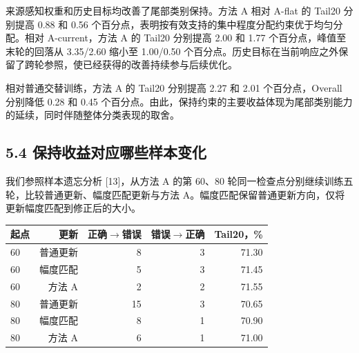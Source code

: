 \documentclass[10pt,twocolumn,letterpaper]{article}
\begin{document}
来源感知权重和历史目标均改善了尾部类别保持。方法 A 相对 A-flat 的 Tail20 分别提高 0.88 和 0.56 个百分点，表明按有效支持的集中程度分配约束优于均匀分配。相对 A-current，方法 A 的 Tail20 分别提高 2.00 和 1.77 个百分点，峰值至末轮的回落从 3.35/2.60 缩小至 1.00/0.50 个百分点。历史目标在当前响应之外保留了跨轮参照，使已经获得的改善持续参与后续优化。


相对普通交替训练，方法 A 的 Tail20 分别提高 2.27 和 2.01 个百分点，Overall 分别降低 0.28 和 0.45 个百分点。由此，保持约束的主要收益体现为尾部类别能力的延续，同时伴随整体分类表现的取舍。


\balance

\subsection*{5.4 保持收益对应哪些样本变化}

我们参照样本遗忘分析 [13]，从方法 A 的第 60、80 轮同一检查点分别继续训练五轮，比较普通更新、幅度匹配更新与方法 A。幅度匹配保留普通更新方向，仅将更新幅度匹配到修正后的大小。


\par\medskip\noindent\begin{minipage}{\columnwidth}\centering{}\small\setlength{\tabcolsep}{3pt}

\begin{tabularx}{\columnwidth}{Xrrrr}\toprule 起点 & 更新 & 正确$\rightarrow$错误 & 错误$\rightarrow$正确 & Tail20，\% \\\midrule

60 & 普通更新 & 8 & 3 & 71.30 \\

60 & 幅度匹配 & 5 & 3 & 71.45 \\

60 & 方法 A & 2 & 2 & 71.55 \\

80 & 普通更新 & 15 & 3 & 70.65 \\

80 & 幅度匹配 & 8 & 1 & 70.90 \\

80 & 方法 A & 6 & 1 & 71.00 \\

\bottomrule\end{tabularx}\end{minipage}\par\medskip
\end{document}
